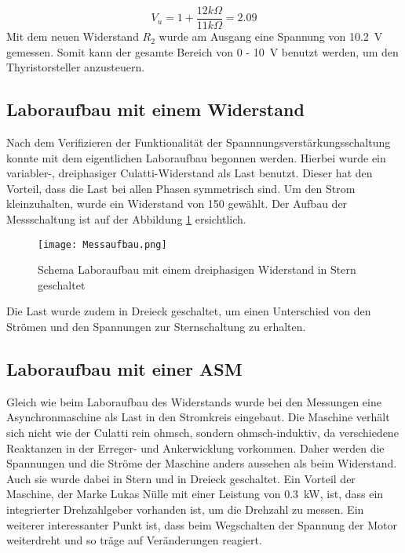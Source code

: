 \begin{equation}\label{eq:Verstaerkungsschaltung_neu}
V_u = 1 + \frac{12k\Omega}{11k\Omega} = 2.09
\end{equation}
Mit dem neuen Widerstand $R_2$ wurde am Ausgang  eine Spannung von \SI{10.2}{V} gemessen. Somit kann der gesamte Bereich von 0 - \SI{10}{V} benutzt werden, um den Thyristorsteller anzusteuern.

\subsection{Laboraufbau mit einem Widerstand}
Nach dem Verifizieren der Funktionalität der Spannnungsverstärkungsschaltung konnte mit dem eigentlichen Laboraufbau begonnen werden. Hierbei wurde ein variabler-, dreiphasiger Culatti-Widerstand als Last benutzt. Dieser hat den Vorteil, dass die Last bei allen Phasen symmetrisch sind. Um den Strom kleinzuhalten, wurde ein Widerstand von \SI{150}{\Omega} gewählt. Der Aufbau der Messschaltung ist auf der Abbildung \ref{fig:Messaufbau} ersichtlich.


\begin{figure}[ht!]
	\centering
	\texttt{[image: Messaufbau.png]}	
	\caption{Schema Laboraufbau mit einem dreiphasigen Widerstand in Stern geschaltet}\label{fig:Messaufbau}
\end{figure}

Die Last wurde zudem in Dreieck geschaltet, um einen Unterschied von den Strömen und den Spannungen zur Sternschaltung zu erhalten.

\subsection{Laboraufbau mit einer ASM}

Gleich wie beim Laboraufbau des Widerstands wurde bei den Messungen eine Asynchronmaschine als Last in den Stromkreis eingebaut. Die Maschine verhält sich nicht wie der Culatti rein ohmsch, sondern ohmsch-induktiv, da verschiedene Reaktanzen in der Erreger- und Ankerwicklung vorkommen. Daher werden die Spannungen und die Ströme der Maschine anders aussehen als beim Widerstand. Auch sie wurde dabei in Stern und in Dreieck geschaltet. Ein Vorteil der Maschine, der Marke Lukas Nülle mit einer Leistung von \SI{0.3}{kW}, ist, dass ein integrierter Drehzahlgeber vorhanden ist, um die Drehzahl zu messen. Ein weiterer interessanter Punkt ist, dass beim Wegschalten der Spannung der Motor weiterdreht und so träge auf Veränderungen reagiert.  


